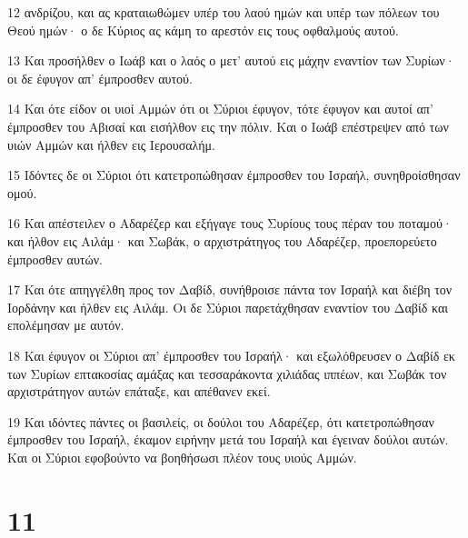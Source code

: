 \par 12 ανδρίζου, και ας κραταιωθώμεν υπέρ του λαού ημών και υπέρ των πόλεων του Θεού ημών· ο δε Κύριος ας κάμη το αρεστόν εις τους οφθαλμούς αυτού.
\par 13 Και προσήλθεν ο Ιωάβ και ο λαός ο μετ' αυτού εις μάχην εναντίον των Συρίων· οι δε έφυγον απ' έμπροσθεν αυτού.
\par 14 Και ότε είδον οι υιοί Αμμών ότι οι Σύριοι έφυγον, τότε έφυγον και αυτοί απ' έμπροσθεν του Αβισαί και εισήλθον εις την πόλιν. Και ο Ιωάβ επέστρεψεν από των υιών Αμμών και ήλθεν εις Ιερουσαλήμ.
\par 15 Ιδόντες δε οι Σύριοι ότι κατετροπώθησαν έμπροσθεν του Ισραήλ, συνηθροίσθησαν ομού.
\par 16 Και απέστειλεν ο Αδαρέζερ και εξήγαγε τους Συρίους τους πέραν του ποταμού· και ήλθον εις Αιλάμ· και Σωβάκ, ο αρχιστράτηγος του Αδαρέζερ, προεπορεύετο έμπροσθεν αυτών.
\par 17 Και ότε απηγγέλθη προς τον Δαβίδ, συνήθροισε πάντα τον Ισραήλ και διέβη τον Ιορδάνην και ήλθεν εις Αιλάμ. Οι δε Σύριοι παρετάχθησαν εναντίον του Δαβίδ και επολέμησαν με αυτόν.
\par 18 Και έφυγον οι Σύριοι απ' έμπροσθεν του Ισραήλ· και εξωλόθρευσεν ο Δαβίδ εκ των Συρίων επτακοσίας αμάξας και τεσσαράκοντα χιλιάδας ιππέων, και Σωβάκ τον αρχιστράτηγον αυτών επάταξε, και απέθανεν εκεί.
\par 19 Και ιδόντες πάντες οι βασιλείς, οι δούλοι του Αδαρέζερ, ότι κατετροπώθησαν έμπροσθεν του Ισραήλ, έκαμον ειρήνην μετά του Ισραήλ και έγειναν δούλοι αυτών. Και οι Σύριοι εφοβούντο να βοηθήσωσι πλέον τους υιούς Αμμών.

\chapter{11}

